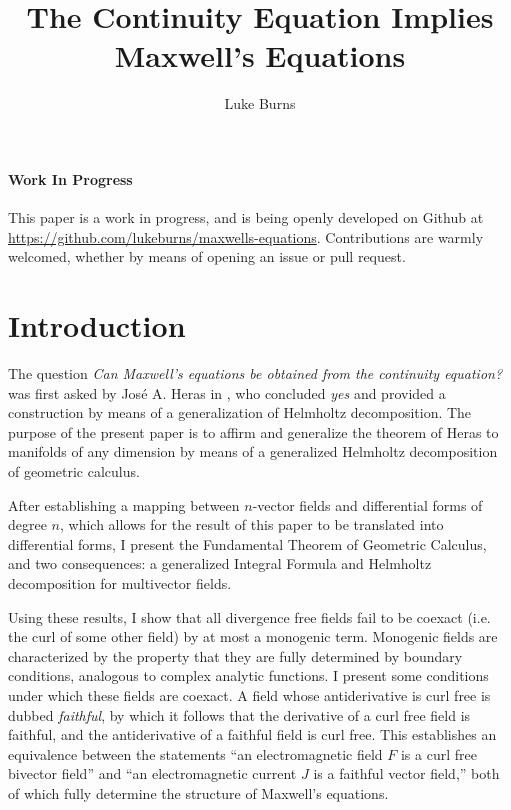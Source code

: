 \documentclass{article}
\title{The Continuity Equation Implies Maxwell's Equations}
\author{Luke Burns}
\begin{document}
\maketitle
{}

\paragraph{Work In Progress} This paper is a work in progress, and is being openly developed on Github at \url{https://github.com/lukeburns/maxwells-equations}. Contributions are warmly welcomed, whether by means of opening an issue or pull request.

\section{Introduction}

The question \emph{Can Maxwell’s equations be obtained from
the continuity equation?} was first asked by Jos\'e A. Heras in \cite{heras}, who concluded \emph{yes} and provided a construction by means of a generalization of Helmholtz decomposition. The purpose of the present paper is to affirm and generalize the theorem of Heras to manifolds of any dimension by means of a generalized Helmholtz decomposition of geometric calculus.

After establishing a mapping between $n$-vector fields and differential forms of degree $n$, which allows for the result of this paper to be translated into differential forms, I present the Fundamental Theorem of Geometric Calculus, and two consequences: a generalized Integral Formula and Helmholtz decomposition for multivector fields.

Using these results, I show that all divergence free fields fail to be coexact (i.e. the curl of some other field) by at most a monogenic term. Monogenic fields are characterized by the property that they are fully determined by boundary conditions, analogous to complex analytic functions. I present some conditions under which these fields are coexact. A field whose antiderivative is curl free is dubbed \emph{faithful}, by which it follows that the derivative of a curl free field is faithful, and the antiderivative of a faithful field is curl free. This establishes an equivalence between the statements ``an electromagnetic field $F$ is a curl free bivector field'' and ``an electromagnetic current $J$ is a faithful vector field,'' both of which fully determine the structure of Maxwell's equations. 
\end{document}
